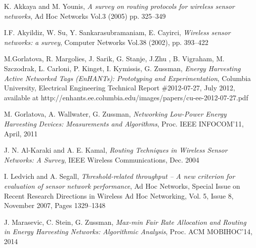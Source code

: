\documentclass[12 pt]{article}
\newcommand{\debug}[1]{\mbox{\tt #1}}
\renewcommand{\debug}[1]{}              \newcommand{\cmd}[1]{}
\begin{document}
\newpage
\renewcommand{\fname}{} \renewcommand{\sname}{}

\begin{thebibliography}{RMME09}

 K. Akkaya and M. Younis, \emph{A survey on routing protocols for wireless sensor networks}, Ad Hoc Networks Vol.3 (2005) pp. 325–349 \debug{[survey3]}

 I.F. Akyildiz, W. Su, Y. Sankarasubramaniam, E. Cayirci, \emph{Wireless sensor networks: a survey}, Computer Networks Vol.38 (2002), pp. 393–422 \debug{[Survey1]}

 M.Gorlatova, R. Margolies, J. Sarik, G. Stanje, J.Zhu , B. Vigraham, M. Szczodrak, L. Carloni, P. Kinget, I. Kymissis, G. Zussman, \emph{Energy Harvesting Active Networked Tags (EnHANTs): Prototyping and Experimentation}, Columbia University, Electrical Engineering Technical Report \#2012-07-27, July 2012, available at http://enhants.ee.columbia.edu/images/papers/cu-ee-2012-07-27.pdf \debug{[Columbia Tech Report]}

M. Gorlatova, A. Wallwater, G. Zussman,
\emph{Networking Low-Power Energy Harvesting Devices: Measurements and
  Algorithms},  Proc. IEEE INFOCOM'11, April, 2011 \debug{ [Infocom 2011]}

 J. N. Al-Karaki and A. E. Kamal, \emph{Routing Techniques in Wireless Sensor Networks: A Survey}, IEEE Wireless Communications, Dec. 2004 \debug{[survey2]}

 I. Ledvich and A. Segall, \emph{Threshold-related throughput – A new criterion for evaluation of sensor network performance}, Ad Hoc Networks, Special Issue on Recent Research Directions in Wireless Ad Hoc Networking, Vol. 5, Issue 8, November 2007, Pages 1329–1348 \debug{[Segall Ledvich]}

  J. Marasevic, C. Stein, G. Zussman, \emph{Max-min Fair Rate Allocation and Routing in Energy Harvesting Networks: Algorithmic Analysis}, Proc. ACM MOBIHOC'14, 2014 \debug{ [MSZ- MaxMin]}














\end{thebibliography}


\iffalse

[1] 	Power Scavenging Networked Nodes (PoSNeNs):
Design, Prototyping, and Experimentation
ACM SenSys’12 Submission #195

\fi
\end{document}
